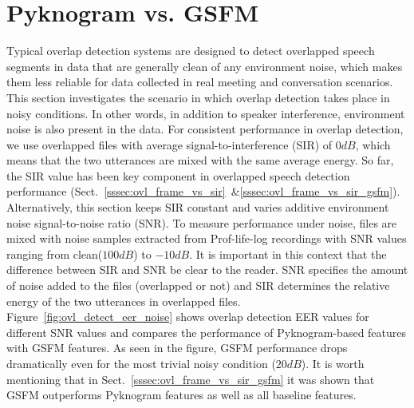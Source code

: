 {\section{Pyknogram vs. GSFM} 
Typical overlap detection systems are designed to detect overlapped speech segments in data that are generally clean of any environment noise, which makes them less reliable for data collected in real meeting and conversation scenarios. 
This section investigates the scenario in which overlap detection takes place in noisy conditions. 
In other words, in addition to speaker interference, environment noise is also present in the data. 
For consistent performance in overlap detection, we use overlapped files with average signal-to-interference (SIR) of $0dB$, which means that the two utterances are mixed with the same average energy. 
So far, the SIR value has been key component in overlapped speech detection performance (Sect.~\ref{sssec:ovl_frame_vs_sir}~\&\ref{sssec:ovl_frame_vs_sir_gsfm}).
Alternatively, this section keeps SIR constant and varies additive environment noise signal-to-noise ratio (SNR).
To measure performance under noise, files are mixed with noise samples extracted from Prof-life-log\cite{ziaei2013prof} recordings with SNR values ranging from clean($100dB$) to $-10dB$. 
It is important in this context that the difference between SIR and SNR be clear to the reader. 
SNR specifies the amount of noise added to the files (overlapped or not) and SIR determines the relative energy of the two utterances in overlapped files. 
Figure~\ref{fig:ovl_detect_eer_noise} shows overlap detection EER values for different SNR values and compares the performance of Pyknogram-based features with GSFM features. 
As seen in the figure, GSFM performance drops dramatically even for the most trivial noisy condition ($20dB$). 
It is worth mentioning that in Sect.~\ref{sssec:ovl_frame_vs_sir_gsfm} it was shown that GSFM outperforms Pyknogram features as well as all baseline features. 

}
